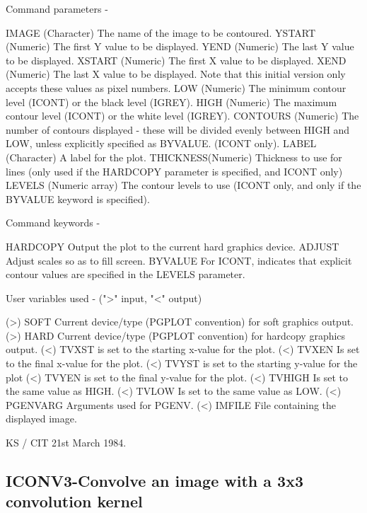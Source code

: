 \begin{description}
\begin{description}
\begin{terminalv}
 Command parameters -

 IMAGE    (Character) The name of the image to be contoured.
 YSTART   (Numeric) The first Y value to be displayed.
 YEND     (Numeric) The last Y value to be displayed.
 XSTART   (Numeric) The first X value to be displayed.
 XEND     (Numeric) The last X value to be displayed.
          Note that this initial version only accepts these
          values as pixel numbers.
 LOW      (Numeric) The minimum contour level (ICONT) or
          the black level (IGREY).
 HIGH     (Numeric) The maximum contour level (ICONT) or
          the white level (IGREY).
 CONTOURS (Numeric) The number of contours displayed - these
          will be divided evenly between HIGH and LOW, unless
          explicitly specified as BYVALUE. (ICONT only).
 LABEL    (Character) A label for the plot.
 THICKNESS(Numeric) Thickness to use for lines (only used if
          the HARDCOPY parameter is specified, and ICONT only)
 LEVELS   (Numeric array) The contour levels to use (ICONT only,
          and only if the BYVALUE keyword is specified).

 Command keywords -

 HARDCOPY Output the plot to the current hard graphics device.
 ADJUST   Adjust scales so as to fill screen.
 BYVALUE  For ICONT, indicates that explicit contour values are
          specified in the LEVELS parameter.

 User variables used -   (">" input, "<" output)

 (>) SOFT     Current device/type (PGPLOT convention) for soft
              graphics output.
 (>) HARD     Current device/type (PGPLOT convention) for hardcopy
              graphics output.
 (<) TVXST    is set to the starting x-value for the plot.
 (<) TVXEN    Is set to the final x-value for the plot.
 (<) TVYST    is set to the starting y-value for the plot
 (<) TVYEN    is set to the final y-value for the plot.
 (<) TVHIGH   Is set to the same value as HIGH.
 (<) TVLOW    Is set to the same value as LOW.
 (<) PGENVARG Arguments used for PGENV.
 (<) IMFILE   File containing the displayed image.

                                           KS / CIT 21st March 1984.
\end{terminalv}
\end{description}
\subsection{ICONV3-\label{ICONV3}Convolve an image with a 3x3 convolution kernel}
\begin{description}


\end{description}
\end{description}

